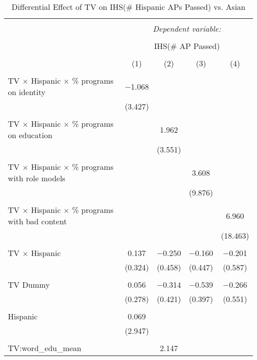 
\begin{table}[!htbp] \centering 
  \caption{Differential Effect of TV on IHS(\# Hispanic APs Passed) vs. Asian} 
  \label{} 
\begin{tabular}{@{\extracolsep{-2pt}}lcccc} 
\\[-1.8ex]\hline 
\hline \\[-1.8ex] 
 & \multicolumn{4}{c}{\textit{Dependent variable:}} \\ 
\cline{2-5} 
\\[-1.8ex] & \multicolumn{4}{c}{IHS(\# AP Passed)} \\ 
\\[-1.8ex] & (1) & (2) & (3) & (4)\\ 
\hline \\[-1.8ex] 
 TV $\times$ Hispanic $\times$ \% programs on identity & $-$1.068 &  &  &  \\ 
  & (3.427) &  &  &  \\ 
  & & & & \\ 
 TV $\times$ Hispanic $\times$ \% programs on education &  & 1.962 &  &  \\ 
  &  & (3.551) &  &  \\ 
  & & & & \\ 
 TV $\times$ Hispanic $\times$ \% programs with role models &  &  & 3.608 &  \\ 
  &  &  & (9.876) &  \\ 
  & & & & \\ 
 TV $\times$ Hispanic $\times$ \% programs with bad content &  &  &  & 6.960 \\ 
  &  &  &  & (18.463) \\ 
  & & & & \\ 
 TV $\times$ Hispanic & 0.137 & $-$0.250 & $-$0.160 & $-$0.201 \\ 
  & (0.324) & (0.458) & (0.447) & (0.587) \\ 
  & & & & \\ 
 TV Dummy & 0.056 & $-$0.314 & $-$0.539 & $-$0.266 \\ 
  & (0.278) & (0.421) & (0.397) & (0.551) \\ 
  & & & & \\ 
 Hispanic & 0.069 &  &  &  \\ 
  & (2.947) &  &  &  \\ 
  & & & & \\ 
 TV:word\_edu\_mean &  & 2.147 &  &  \\ 

\end{tabular}
\end{table}
